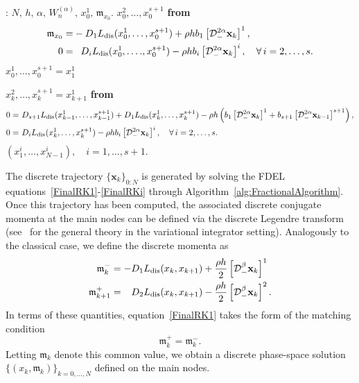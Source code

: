 \documentclass[a4paper,10pt,reqno]{amsart}
\theoremstyle{definition}
\newcommand{\m}{\mathfrak{m}}
\newcommand{\dis}{\text{dis}}
\begin{document}
\begin{algorithm}{}
\begin{algorithmic}[1]
: $N,\, h,\,\alpha,\,W_n^{(\alpha)},\, x_0^1,\, \m_{x_0}.$
  $x_0^2, \ldots,x_0^{s+1}$ {\bf from} 
\[
\begin{split}
\m_{x_0}=&-D_1L_\dis(x_0^1, \ldots,x_0^{s+1})+\rho hb_1\left[\mathcal{D}^{2\alpha}_{-}{\bf x}_k\right]^1,\\
0=&\phantom{-} D_iL_\dis(x_0^1, \ldots.,x_0^{s+1})-\rho hb_i\left[\mathcal{D}^{2\alpha}_{-}{\bf x}_k\right]^i,\quad \forall\,i=2, \ldots,s.
\end{split}
\]
 $x_0^1, \ldots,x_0^{s+1}=x_1^1$
    
 $x_{k}^2, \ldots,x_k^{s+1}=x_{k+1}^1$ {\bf from} 
\[
\begin{split}
0=&\,\,D_{s+1}L_\dis(x_{k-1}^1, \ldots,x_{k-1}^{s+1})+ D_1L_\dis(x_k^1, \ldots,x_k^{s+1})-\rho h \left(b_1\left[\mathcal{D}^{2\alpha}_{-}{\bf x}_k\right]^1+b_{s+1}\left[\mathcal{D}^{2\alpha}_{-}{\bf x}_{k-1}\right]^{s+1}\right),\\
0=&\,\,D_iL_\dis(x_k^1, \ldots,x_k^{s+1})-\rho h b_i\left[\mathcal{D}^{2\alpha}_{-}{\bf x}_k\right]^i,\quad \forall\,i=2, \ldots,s.
\end{split}
\]
    \EndFor
     $(x_1^{i}, \ldots,x_{N-1}^{i}),\quad i=1, \ldots,s+1.$
\end{algorithmic}
\caption{Fractional Variational Integrator (FVI)  with RKCQ}\label{alg:FractionalAlgorithm}
\end{algorithm}

The discrete trajectory $\{\mathbf{x}_k\}_{0:N}$ is generated by solving the FDEL equations~\eqref{FinalRK1}-\eqref{FinalRKi} through Algorithm~\ref{alg:FractionalAlgorithm}. Once this trajectory has been computed, the associated discrete conjugate momenta at the main nodes can be defined via the discrete Legendre transform (see~\cite{MaWe,SinaVerm,SinaSaake} for the general theory in the variational integrator setting). Analogously to the classical  case, we define the discrete momenta as
\begin{align}\label{eq:xpart_frac_hamiltonian_sys2}
\begin{split}
        \m_k^-&=-D_1L_\dis(x_k,x_{k+1})+\frac{\rho h}{2} \left[\mathcal{D}^{\beta}_{-}{\bf x}_k\right]^1\\
   \m_{k+1}^+&=\phantom{-}D_2L_\dis(x_k,x_{k+1})-\frac{\rho h}{2} \left[\mathcal{D}^{\beta}_{-}{\bf x}_k\right]^2.
\end{split}
\end{align}
In terms of these quantities, equation~\eqref{FinalRK1} takes the form of the matching condition
$$\m_k^+=\m_k^-.$$
Letting 
$\m_k$ denote this common value, we obtain a discrete phase-space solution 
$\{(x_k,\m_k)\}_{k=0,\ldots,N}$ defined on the main nodes.
\end{document}
